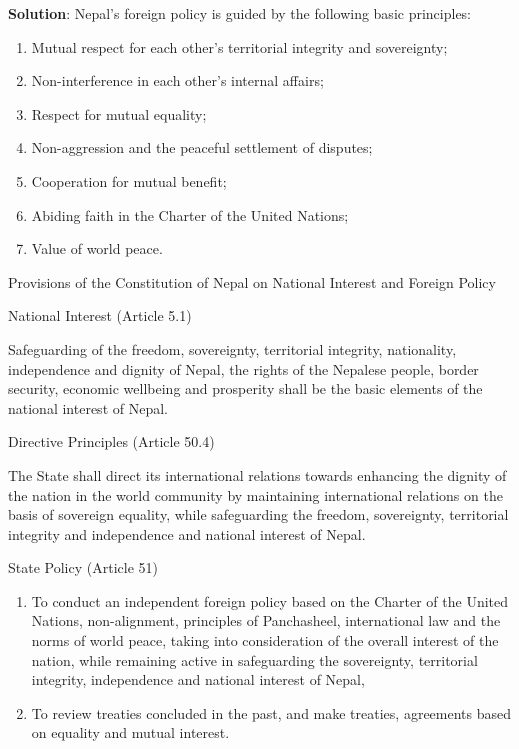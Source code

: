 \documentclass[
  openany]{book}
\newenvironment{solution}{ {\bfseries Solution}:}{}
\begin{document}
\begin{questions}
\begin{solution}
Nepal's foreign policy is guided by the following basic principles:

\begin{enumerate}
\item Mutual respect for each other’s territorial integrity and sovereignty;
\item Non-interference in each other’s internal affairs;
\item Respect for mutual equality;
\item Non-aggression and the peaceful settlement of disputes;
\item Cooperation for mutual benefit;
\item Abiding faith in the Charter of the United Nations;
\item Value of world peace.
\end{enumerate}

Provisions of the Constitution of Nepal on National Interest and Foreign Policy

National Interest (Article 5.1)

Safeguarding of the freedom, sovereignty, territorial integrity, nationality, independence and dignity of Nepal, the rights of the Nepalese people, border security, economic wellbeing and prosperity shall be the basic elements of the national interest of Nepal.

Directive Principles (Article 50.4)

The State shall direct its international relations towards enhancing the dignity of the nation in the world community by maintaining international relations on the basis of sovereign equality, while safeguarding the freedom, sovereignty, territorial integrity and independence and national interest of Nepal.

State Policy (Article 51)

\begin{enumerate}
\item To conduct an independent foreign policy based on the Charter of the United Nations, non-alignment, principles of Panchasheel, international law and the norms of world peace, taking into consideration of the overall interest of the nation, while remaining active in safeguarding the sovereignty, territorial integrity, independence and national interest of Nepal,
\item To review treaties concluded in the past, and make treaties, agreements based on equality and mutual interest.
\end{enumerate}


\end{solution}
\end{questions}
\end{document}
